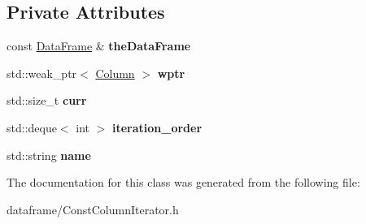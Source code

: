 \subsection*{Private Attributes}
\begin{DoxyCompactItemize}
\item 
\mbox{\label{classDataFrame_1_1const__iterator_a38602671a4e2711c365b4a311cbb95ae}} 
const \hyperlink{classDataFrame}{Data\+Frame} \& {\bfseries the\+Data\+Frame}
\item 
\mbox{\label{classDataFrame_1_1const__iterator_ae6daa4da25886ffb92bb2e1044872b54}} 
std\+::weak\+\_\+ptr$<$ \hyperlink{classColumn}{Column} $>$ {\bfseries wptr}
\item 
\mbox{\label{classDataFrame_1_1const__iterator_a72a1df15cb8f1e5769e926fa724a587a}} 
std\+::size\+\_\+t {\bfseries curr}
\item 
\mbox{\label{classDataFrame_1_1const__iterator_a998110b162b0b40eee742f6415bd6e97}} 
std\+::deque$<$ int $>$ {\bfseries iteration\+\_\+order}
\item 
\mbox{\label{classDataFrame_1_1const__iterator_a77b797e8f0828623f7b5fb373a8a41e2}} 
std\+::string {\bfseries name}
\end{DoxyCompactItemize}


The documentation for this class was generated from the following file\+:\begin{DoxyCompactItemize}
\item 
dataframe/Const\+Column\+Iterator.\+h\end{DoxyCompactItemize}
